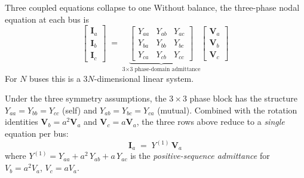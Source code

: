 \documentclass[aspectratio=169,10pt]{beamer}
\begin{document}
\begin{frame}{Three coupled equations collapse to one}
Without balance, the three-phase nodal equation at each bus is
\begin{equation*}
\begin{bmatrix} \mathbf{I}_a \\ \mathbf{I}_b \\ \mathbf{I}_c \end{bmatrix}
\;=\;
\underbrace{\begin{bmatrix}
Y_{aa} & Y_{ab} & Y_{ac} \\
Y_{ba} & Y_{bb} & Y_{bc} \\
Y_{ca} & Y_{cb} & Y_{cc}
\end{bmatrix}}_{\text{3$\times$3 phase-domain admittance}}
\begin{bmatrix} \mathbf{V}_a \\ \mathbf{V}_b \\ \mathbf{V}_c \end{bmatrix}
\end{equation*}
For $N$ buses this is a $3N$-dimensional linear system.
\vspace{0.3em}

Under the three symmetry assumptions, the $3\times 3$ phase block has the structure
$Y_{aa}=Y_{bb}=Y_{cc}$ (self) and $Y_{ab}=Y_{bc}=Y_{ca}$ (mutual). Combined with the rotation identities $\mathbf{V}_b = a^2 \mathbf{V}_a$ and $\mathbf{V}_c = a \mathbf{V}_a$, the three rows above reduce to a \emph{single} equation per bus:
\begin{equation*}
\boxed{\;\;\mathbf{I}_a \;=\; Y^{(1)} \, \mathbf{V}_a\;\;}
\end{equation*}
where $Y^{(1)} = Y_{aa} + a^2 \, Y_{ab} + a \, Y_{ac}$ is the \emph{positive-sequence admittance} for $V_b=a^2V_a$, $V_c=aV_a$.
\end{frame}
\end{document}
